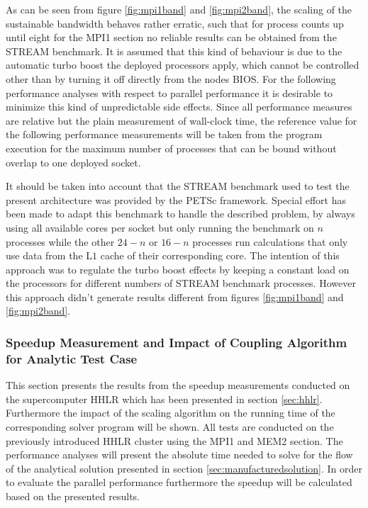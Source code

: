 As can be seen from figure \ref{fig:mpi1band} and \ref{fig:mpi2band}, the scaling of the sustainable bandwidth behaves rather erratic, such that for process counts up until eight for the MPI1 section no reliable results can be obtained from the STREAM benchmark. It is assumed that this kind of behaviour is due to the automatic turbo boost the deployed processors apply, which cannot be controlled other than by turning it off directly from the nodes BIOS. For the following performance analyses with respect to parallel performance it is desirable to minimize this kind of unpredictable side effects. Since all performance measures are relative but the plain measurement of wall-clock time, the reference value for the following performance measurements will be taken from the program execution for the maximum number of processes that can be bound without overlap to one deployed socket.

It should be taken into account that the STREAM benchmark used to test the present architecture was provided by the PETSc framework. Special effort has been made to adapt this benchmark to handle the described problem, by always using all available cores per socket but only running the benchmark on \(n\) processes while the other \(24 - n\) or \(16 - n\) processes run calculations that only use data from the L\(1\) cache of their corresponding core. The intention of this approach was to regulate the turbo boost effects by keeping a constant load on the processors for different numbers of STREAM benchmark processes. However this approach didn't generate results different from figures \ref{fig:mpi1band} and \ref{fig:mpi2band}.

\subsubsection{Speedup Measurement and Impact of Coupling Algorithm for Analytic Test Case}

This section presents the results from the speedup measurements conducted on the supercomputer HHLR which has been presented in section \ref{sec:hhlr}. Furthermore the impact of the scaling algorithm on the running time of the corresponding solver program will be shown. All tests are conducted on the previously introduced HHLR cluster using the MPI1 and MEM2 section. The performance analyses will present the absolute time needed to solve for the flow of the analytical solution presented in section \ref{sec:manufacturedsolution}. In order to evaluate the parallel performance furthermore the speedup will be calculated based on the presented results. 

